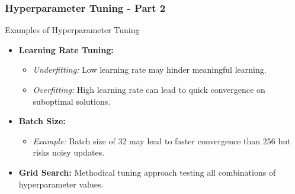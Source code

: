 \documentclass[aspectratio=169]{beamer}
\begin{document}
\begin{frame}[fragile]
    \frametitle{Hyperparameter Tuning - Part 2}

    \begin{block}{Examples of Hyperparameter Tuning}
        \begin{itemize}
            \item \textbf{Learning Rate Tuning:}
                \begin{itemize}
                    \item \textit{Underfitting:} Low learning rate may hinder meaningful learning.
                    \item \textit{Overfitting:} High learning rate can lead to quick convergence on suboptimal solutions.
                \end{itemize}
            \item \textbf{Batch Size:}
                \begin{itemize}
                    \item \textit{Example:} Batch size of 32 may lead to faster convergence than 256 but risks noisy updates.
                \end{itemize}
            \item \textbf{Grid Search:} Methodical tuning approach testing all combinations of hyperparameter values.
        \end{itemize}
    \end{block}

\end{frame}
\end{document}
